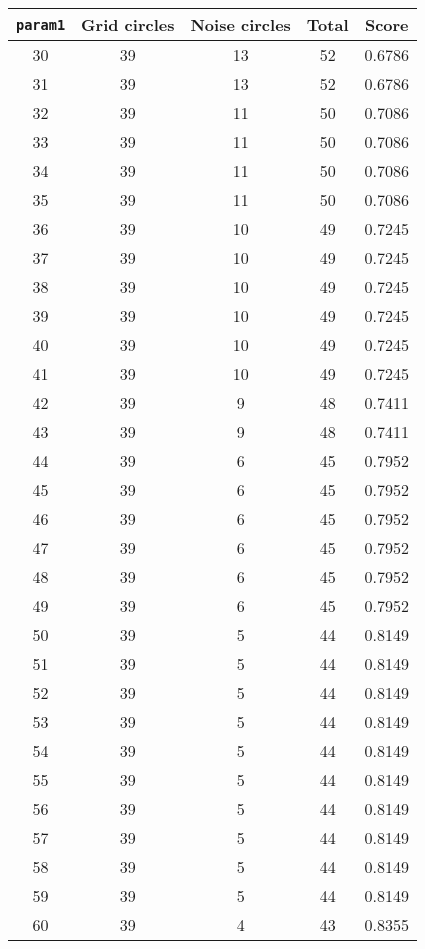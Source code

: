 \documentclass[letterpaper, 12pt]{article}
\begin{document}
\begin{longtable}{|c|c|c|c|c|}
\hline
\textbf{\texttt{param1}} & \textbf{Grid circles} & \textbf{Noise circles} & \textbf{Total} & \textbf{Score} \\
\hline
30 & 39 & 13 & 52 & 0.6786 \\
\hline
31 & 39 & 13 & 52 & 0.6786 \\
\hline
32 & 39 & 11 & 50 & 0.7086 \\
\hline
33 & 39 & 11 & 50 & 0.7086 \\
\hline
34 & 39 & 11 & 50 & 0.7086 \\
\hline
35 & 39 & 11 & 50 & 0.7086 \\
\hline
36 & 39 & 10 & 49 & 0.7245 \\
\hline
37 & 39 & 10 & 49 & 0.7245 \\
\hline
38 & 39 & 10 & 49 & 0.7245 \\
\hline
39 & 39 & 10 & 49 & 0.7245 \\
\hline
40 & 39 & 10 & 49 & 0.7245 \\
\hline
41 & 39 & 10 & 49 & 0.7245 \\
\hline
42 & 39 & 9 & 48 & 0.7411 \\
\hline
43 & 39 & 9 & 48 & 0.7411 \\
\hline
44 & 39 & 6 & 45 & 0.7952 \\
\hline
45 & 39 & 6 & 45 & 0.7952 \\
\hline
46 & 39 & 6 & 45 & 0.7952 \\
\hline
47 & 39 & 6 & 45 & 0.7952 \\
\hline
48 & 39 & 6 & 45 & 0.7952 \\
\hline
49 & 39 & 6 & 45 & 0.7952 \\
\hline
50 & 39 & 5 & 44 & 0.8149 \\
\hline
51 & 39 & 5 & 44 & 0.8149 \\
\hline
52 & 39 & 5 & 44 & 0.8149 \\
\hline
53 & 39 & 5 & 44 & 0.8149 \\
\hline
54 & 39 & 5 & 44 & 0.8149 \\
\hline
55 & 39 & 5 & 44 & 0.8149 \\
\hline
56 & 39 & 5 & 44 & 0.8149 \\
\hline
57 & 39 & 5 & 44 & 0.8149 \\
\hline
58 & 39 & 5 & 44 & 0.8149 \\
\hline
59 & 39 & 5 & 44 & 0.8149 \\
\hline
60 & 39 & 4 & 43 & 0.8355 \\
\hline

\end{longtable}
\end{document}

